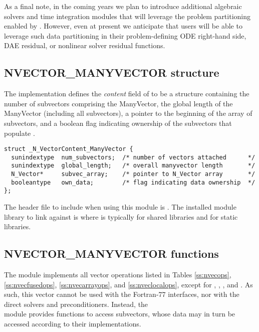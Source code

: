 As a final note, in the coming years we plan to introduce additional
algebraic solvers and time integration modules that will leverage the
problem partitioning enabled by {\nvecmanyvector}.  However, even at
present we anticipate that users will be able to leverage such data
partitioning in their problem-defining ODE right-hand side, DAE
residual, or nonlinear solver residual functions.


\subsection{NVECTOR\_MANYVECTOR structure}
\label{ss:nvec_manyvector_structure}

The {\nvecmanyvector} implementation defines the {\em content} field
of  to be a structure containing the number of
subvectors comprising the ManyVector, the global length of the
ManyVector (including all subvectors), a pointer to
the beginning of the array of subvectors, and a boolean flag
 indicating ownership of the subvectors that populate
.
\begin{verbatim} 
struct _N_VectorContent_ManyVector {
  sunindextype  num_subvectors;  /* number of vectors attached      */
  sunindextype  global_length;   /* overall manyvector length       */
  N_Vector*     subvec_array;    /* pointer to N_Vector array       */
  booleantype   own_data;        /* flag indicating data ownership  */
};
\end{verbatim}

The header file to include when using this module is
. The installed module library to link against is
 where  is typically
 for shared libraries and  for static libraries.



\subsection{NVECTOR\_MANYVECTOR functions}
\label{ss:nvec_manyvector_functions}

The {\nvecmanyvector} module implements all vector operations listed 
in Tables \ref{ss:nvecops}, \ref{ss:nvecfusedops}, \ref{ss:nvecarrayops},
and \ref{ss:nveclocalops}, except for ,
, , and
.  As such, this vector cannot be
used with the {\sundials} Fortran-77 interfaces, nor with the
{\sundials} direct solvers and preconditioners. Instead, the \\
{\nvecmanyvector} module provides functions to access subvectors,
whose data may in turn be accessed according to their {\nvector}
implementations.

